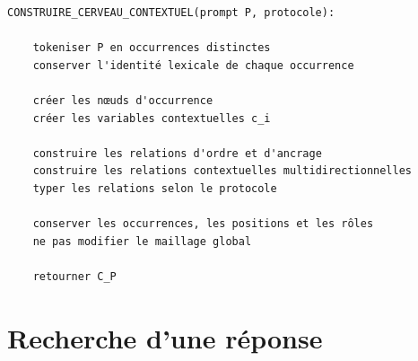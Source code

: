 \documentclass[11pt,a4paper,oneside]{book}
\theoremstyle{remark}
\begin{document}
\begin{verbatim}
CONSTRUIRE_CERVEAU_CONTEXTUEL(prompt P, protocole):

    tokeniser P en occurrences distinctes
    conserver l'identité lexicale de chaque occurrence

    créer les nœuds d'occurrence
    créer les variables contextuelles c_i

    construire les relations d'ordre et d'ancrage
    construire les relations contextuelles multidirectionnelles
    typer les relations selon le protocole

    conserver les occurrences, les positions et les rôles
    ne pas modifier le maillage global

    retourner C_P
\end{verbatim}

\section{Recherche d'une réponse}
\end{document}
